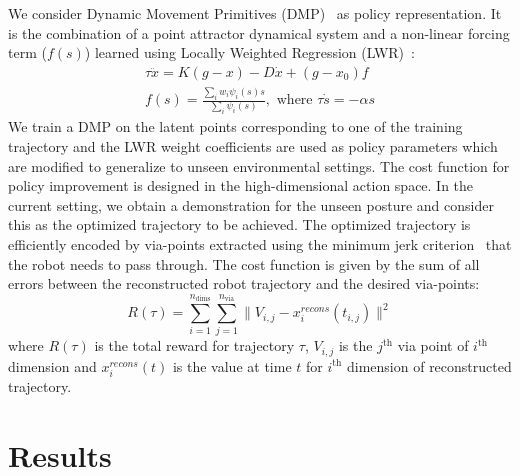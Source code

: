 \documentclass{article}
\begin{document}
We consider Dynamic Movement Primitives (DMP)~\cite{dmp} as policy representation. It is the combination of a point attractor dynamical system and a non-linear forcing term ($f(s)$) learned using Locally Weighted Regression (LWR)~\cite{lwr}:
\begin{equation}
  \begin{array}{c}
    \tau \ddot{x} = K(g-x) -D\dot{x} + (g - x_0)f\\
    \displaystyle f(s) = \frac{\sum_i w_i \psi_i(s)s}{\sum_i \psi_i(s)}, \text{ where } \tau \dot{s} = - \alpha s
  \end{array}
\end{equation}
We train a DMP on the latent points corresponding to one of the training trajectory and the LWR weight coefficients are used as policy parameters which are modified to generalize to unseen environmental settings. The cost function for policy improvement is designed in the high-dimensional action space. In the current setting, we obtain a demonstration for the unseen posture and consider this as the optimized trajectory to be achieved. The optimized trajectory is efficiently encoded by via-points extracted using the minimum jerk criterion~\cite{via} that the robot needs to pass through. The cost function is given by the sum of all errors between the reconstructed robot trajectory and the desired via-points:
\begin{equation}
  R(\tau) = \sum_{i = 1}^{n_{\text{dims}}} \sum_{j = 1}^{n_{\text{via}}} \| V_{i,j} - x^{recons}_i(t_{i,j}) \|^2
\end{equation}
where $R(\tau)$ is the total reward for trajectory $\tau$, $V_{i,j}$ is the $j^{\text{th}}$ via point of $i^{\text{th}}$ dimension and $x^{recons}_i(t)$ is the value at time $t$ for $i^{\text{th}}$ dimension of reconstructed trajectory.
\section{Results}
\label{section:results}
\end{document}
